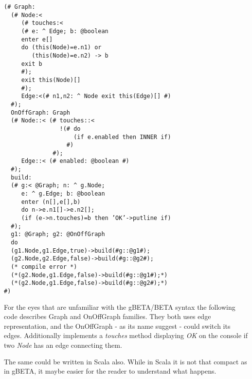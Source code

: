 \documentclass[a4paper, 10pt, conference ]{llncs}
\begin{document}
\begin{verbatim}
(# Graph:
  (# Node:<
     (# touches:<
     (# e: ^ Edge; b: @boolean
     enter e[]
     do (this(Node)=e.n1) or
        (this(Node)=e.n2) -> b
     exit b
     #);
     exit this(Node)[]
     #);
     Edge:<(# n1,n2: ^ Node exit this(Edge)[] #)
  #);
  OnOffGraph: Graph
  (# Node::< (# touches::< 
                !(# do
                    (if e.enabled then INNER if)
                  #)
              #);
     Edge::< (# enabled: @boolean #)
  #);
  build:
  (# g:< @Graph; n: ^ g.Node;
     e: ^ g.Edge; b: @boolean
     enter (n[],e[],b)
     do n->e.n1[]->e.n2[];
     (if (e->n.touches)=b then ’OK’->putline if)
  #);
  g1: @Graph; g2: @OnOffGraph
  do
  (g1.Node,g1.Edge,true)->build(#g::@g1#);
  (g2.Node,g2.Edge,false)->build(#g::@g2#);
  (* compile error *)
  (*(g2.Node,g1.Edge,false)->build(#g::@g1#);*)
  (*(g2.Node,g1.Edge,false)->build(#g::@g2#);*)
#)
\end{verbatim}

For the eyes that are unfamiliar with the gBETA/BETA syntax the following code describes Graph and OnOffGraph families. They both uses edge representation, and the OnOffGraph - as its name suggest - could switch its edges. Additionally implements a \emph{touches} method displaying \emph{OK} on the console if two \emph{Node} has an edge connecting them.

The same could be written in Scala also. While in Scala it is not that compact as in gBETA, it maybe easier for the reader to understand what happens.
\end{document}

